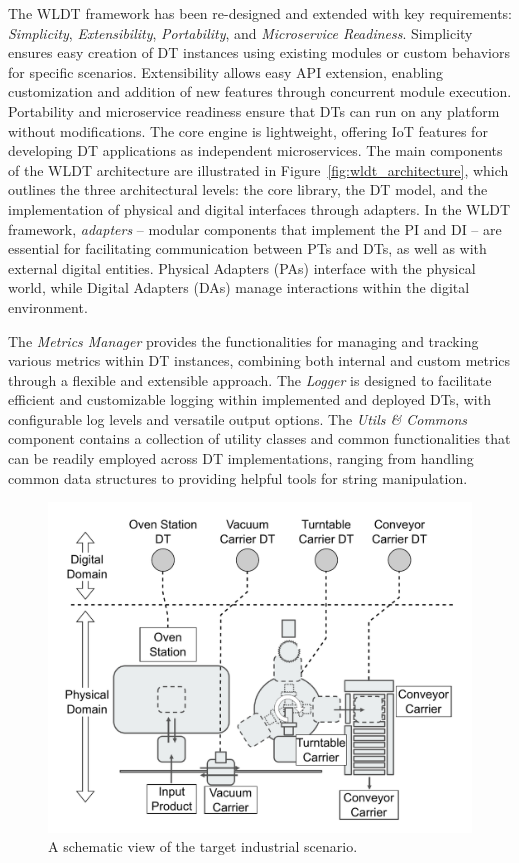 The WLDT framework has been re-designed and extended with key requirements: \textit{Simplicity}, \textit{Extensibility}, \textit{Portability}, and \textit{Microservice Readiness}.
Simplicity ensures easy creation of DT instances using existing modules or custom behaviors for specific scenarios. 
Extensibility allows easy API extension, enabling customization and addition of new features through concurrent module execution.
Portability and microservice readiness ensure that DTs can run on any platform without modifications.
The core engine is lightweight, offering IoT features for developing DT applications as independent microservices.
The main components of the WLDT architecture are illustrated in Figure~\ref{fig:wldt_architecture}, which outlines the three architectural levels: the core library, the DT model, and the implementation of physical and digital interfaces through adapters.
In the WLDT framework, \textit{adapters} -- modular components that implement the PI and DI -- are essential for facilitating communication between PTs and DTs, as well as with external digital entities.
Physical Adapters (PAs) interface with the physical world, while Digital Adapters (DAs) manage interactions within the digital environment.

The \textit{Metrics Manager} provides the functionalities for managing and tracking various metrics within DT instances, combining both internal and custom metrics through a flexible and extensible approach.
The \textit{Logger} is designed to facilitate efficient and customizable logging within implemented and deployed DTs, with configurable log levels and versatile output options.
The \textit{Utils \& Commons} component contains a collection of utility classes and common functionalities that can be readily employed across DT implementations, ranging from handling common data structures to providing helpful tools for string manipulation.

\begin{figure}[th!]
    \setlength{\belowcaptionskip}{-8pt}
    \centering
    \includegraphics[width=\columnwidth]{figures/engineering-wldt/fischer-layout-first-level-dt.pdf}
    \caption{A schematic view of the target industrial scenario.}
    \label{fig:discher-dt-first-level}
\end{figure}

